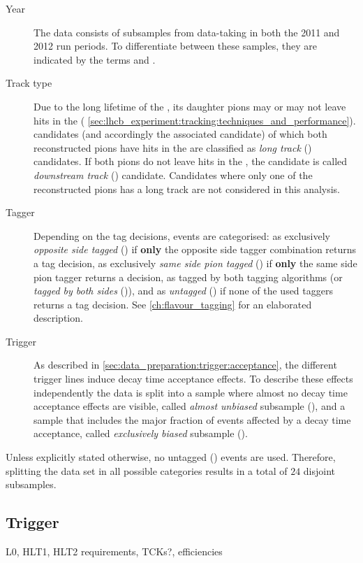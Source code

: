 \begin{description}
  \item[Year] The data consists of subsamples from data-taking in both the 2011
and 2012 run periods. To differentiate between these samples, they are indicated
by the terms \textbf{\catOO} and \textbf{\catOT}.

  \item[Track type] Due to the long lifetime of the \KS, its daughter pions may
or may not leave hits in the \VELO (\cf
\cref{sec:lhcb_experiment:tracking:techniques_and_performance}). \KS candidates
(and accordingly the associated \Bmeson candidate) of which both reconstructed
pions have hits in the \VELO are classified as \emph{long track}
(\textbf{\catLL}) candidates. If both pions do not leave hits in the \VELO, the
candidate is called \emph{downstream track} (\textbf{\catDD}) candidate.
Candidates where only one of the reconstructed pions has a long track are not
considered in this analysis.
  
  \item[Tagger] Depending on the tag decisions, events are categorised: as
  exclusively \emph{opposite side tagged} (\textbf{\catOS}) if \textbf{only} the
opposite side tagger combination returns a tag decision, as exclusively
\emph{same side pion tagged} (\textbf{\catSS}) if \textbf{only} the same side
pion tagger returns a decision, as tagged by both tagging algorithms (or
\emph{tagged by both sides} (\textbf{\catBS})), and as \emph{untagged}
(\textbf{\catUT}) if none of the used taggers returns a tag decision. See
\cref{ch:flavour_tagging} for an elaborated description.
  
  \item[Trigger] As described in \cref{sec:data_preparation:trigger:acceptance}, the
different trigger lines induce decay time acceptance effects. To describe these
effects independently the data is split into a sample where almost no decay time
acceptance effects are visible, called \emph{almost unbiased} subsample
(\textbf{\catAU}), and a sample that includes the major fraction of events
affected by a decay time acceptance, called \emph{exclusively biased} subsample
(\textbf{\catEB}).
\end{description}

Unless explicitly stated otherwise, no untagged (\textbf{\catUT}) events are
used. Therefore, splitting the data set in all possible categories results in a
total of $\num{24}$ disjoint subsamples.

\clearpage
\subsection{Trigger}
\label{sec:measurement_of_sin2beta:data_preparation:trigger}
L0, HLT1, HLT2 requirements, TCKs?, efficiencies

